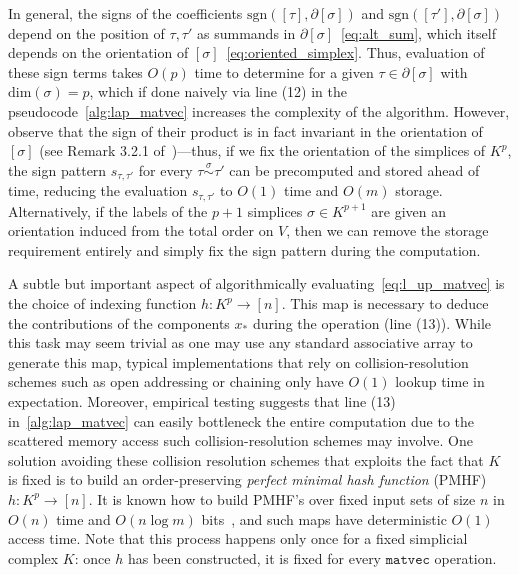 \documentclass[10pt]{article}
\numberwithin{equation}{section}
\newcommand{\+}{%
	\raisebox{0.18ex}{\scaleobj{0.55}{+}}
}
\theoremstyle{definition}
\theoremstyle{definition}
\begin{document}
In general, the signs of the coefficients $\mathrm{sgn}([\tau], \partial[\sigma])$ and $\mathrm{sgn}([\tau'], \partial[\sigma])$ depend on the position of $\tau, \tau'$ as summands in $\partial[\sigma]$~\eqref{eq:alt_sum}, which itself depends on the orientation of $[\sigma]$~\eqref{eq:oriented_simplex}. Thus, evaluation of these sign terms takes $O(p)$ time to determine for a given $\tau \in \partial[\sigma]$ with $\mathrm{dim}(\sigma) = p$, which if done naively via line (12) in the pseudocode~\ref{alg:lap_matvec} increases the complexity of the algorithm. 
However, observe that the sign of their product is in fact invariant in the orientation of $[\sigma]$ (see Remark 3.2.1 of~\cite{goldberg2002combinatorial})---thus, if we fix the orientation of the simplices of $K^p$, the sign pattern $s_{\tau, \tau'}$ for every $\tau \overset{\sigma}{\sim} \tau'$ can be precomputed and stored ahead of time, reducing the evaluation $s_{\tau, \tau'}$ to $O(1)$ time and $O(m)$ storage. 
Alternatively, if the labels of the $p+1$ simplices $\sigma \in K^{p+1}$ are given an orientation induced from the total order on $V$, then we can remove the storage requirement entirely and simply fix the sign pattern during the computation. 

A subtle but important aspect of algorithmically evaluating~\eqref{eq:l_up_matvec} is the choice of indexing function $h: K^p \to [n]$. This map is necessary to deduce the contributions of the components $x_\ast$ during the operation (line (13)). 
While this task may seem trivial as one may use any standard associative array to generate this map, typical implementations that rely on collision-resolution schemes such as open addressing or chaining only have $O(1)$ lookup time in expectation.
Moreover, empirical testing suggests that line (13) in~\ref{alg:lap_matvec} can easily bottleneck the entire computation due to the scattered memory access such collision-resolution schemes may involve. 
One solution avoiding these collision resolution schemes that exploits the fact that $K$ is fixed is to  build an order-preserving \emph{perfect minimal hash function} (PMHF) $h : K^p \to [n]$. 
It is known how to build PMHF's over fixed input sets of size $n$ in $O(n)$ time and $O(n \log m)$ bits~\cite{}, and such maps have deterministic $O(1)$ access time. Note that this process happens only once for a fixed simplicial complex $K$: once $h$ has been constructed, it is fixed for every $\mathtt{matvec}$ operation. 
\end{document}
